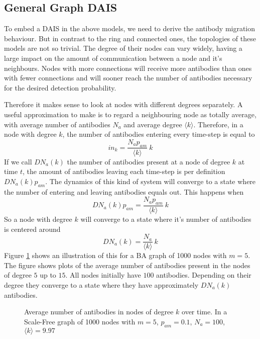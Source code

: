 \documentclass{article}
\begin{document}
\subsection{General Graph DAIS}
\label{sec_dais_arbitrary}
To embed a DAIS in the above models, we need to derive the antibody migration behaviour.
But in contrast to the ring and connected ones, the topologies of these models are not so trivial.
The degree of their nodes can vary widely, having a large impact on the amount of communication between a node and it's neighbours.
Nodes with more connections will receive more antibodies than ones with fewer connections and will sooner reach the number of antibodies necessary for the desired detection probability. 

Therefore it makes sense to look at nodes with different degrees separately.
A useful approximation to make is to regard a neighbouring node as totally average, with average number of antibodies $N_a$ and average degree $\langle k \rangle$.
Therefore, in a node with degree $k$, the number of antibodies entering every time-step is equal to
\begin{equation}
   in_k = \frac{ N_a p_{am}}{\langle k \rangle} ~ k
\end{equation}
If we call $DN_a(k)$ the number of antibodies present at a node of degree $k$ at time $t$, the amount of antibodies leaving each time-step is per definition $DN_a(k) p_{am}$.
The dynamics of this kind of system will converge to a state where the number of entering and leaving antibodies equals out.
This happens when
$$
   DN_a(k) p_{am} = \frac{N_a p_{am}}{\langle k \rangle}~k
$$
So a node with degree $k$ will converge to a state where it's number of antibodies is centered around
\begin{equation}
  DN_a(k) = \frac{N_a}{\langle k \rangle}~k
\end{equation}
Figure \ref{fig_antibodies_per_degree} shows an illustration of this for a BA graph of 1000 nodes with $m = 5$.
The figure shows plots of the average number of antibodies present in the nodes of degree $5$ up to $15$.
All nodes initially have $100$ antibodies. Depending on their degree they converge to a state where they have approximately $DN_a(k)$ antibodies.

\begin{figure}[htp]
   \centerline{
              } 
   \caption{Average number of antibodies in nodes of degree $k$ over time. In a Scale-Free graph of 1000 nodes with $m=5$, $p_{am}=0.1$, $N_a = 100$, $\langle k \rangle = 9.97$ }
   \label{fig_antibodies_per_degree}
\end{figure}
\end{document}
